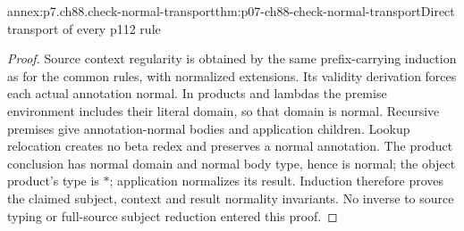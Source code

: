 \begin{annexitem}{annex:p7.ch88.check-normal-transport}{thm:p07-ch88-check-normal-transport}{Direct transport of every p112 rule}
\begin{proof}
Source context regularity is obtained by the same prefix-carrying
induction as for the common rules, with normalized extensions. Its
validity derivation forces each actual annotation normal. In products
and lambdas the premise environment includes their literal domain,
so that domain is normal. Recursive premises give annotation-normal
bodies and application children. Lookup relocation creates no beta
redex and preserves a normal annotation. The product conclusion has
normal domain and normal body type, hence is normal; the object
product's type is \(\ast\); application normalizes its result.
Induction therefore proves the claimed subject, context and result
normality invariants. No inverse to source typing or full-source
subject reduction entered this proof.
\end{proof}
\end{annexitem}


